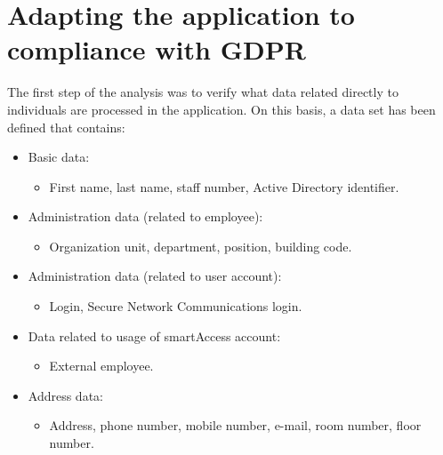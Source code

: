 \documentclass[en, noamssymb]{mgr}
\begin{document}
\section{Adapting the application to compliance with GDPR}

The first step of the analysis was to verify what data related directly to individuals are processed in the application. On this basis, a data set has been defined that contains:

\begin{itemize}

\item Basic data:

\begin{itemize}
\item First name, last name, staff number, Active Directory identifier.
\end{itemize}

\item Administration data (related to employee):

\begin{itemize}
\item Organization unit, department, position, building code.
\end{itemize}

\item Administration data (related to user account):

\begin{itemize}
\item Login, Secure Network Communications login.
\end{itemize}

\item Data related to usage of smartAccess account:

\begin{itemize}
\item External employee.
\end{itemize}

\item Address data:

\begin{itemize}
\item Address, phone number, mobile number, e-mail, room number, floor number.
\end{itemize}

\end{itemize}
\end{document}
